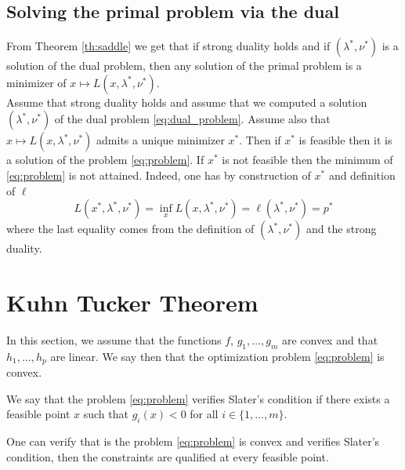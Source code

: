 \documentclass[11pt,nocut]{article}
\begin{document}
\subsection{Solving the primal problem via the dual}

From Theorem \ref{th:saddle} we get that if strong duality holds and if $(\lambda^*,\nu^*)$ is a solution of the dual problem, then any solution of the primal problem is a minimizer of $x \mapsto L(x,\lambda^*,\nu^*)$.
\\

Assume that strong duality holds and assume that we computed a solution $(\lambda^*,\nu^*)$ of the dual problem \eqref{eq:dual_problem}. Assume also that $x \mapsto L(x,\lambda^*,\nu^*)$ admits a unique minimizer $x^*$. Then if $x^*$ is feasible then it is a solution of the problem \eqref{eq:problem}. If $x^*$ is not feasible then the minimum of \eqref{eq:problem} is not attained. Indeed, one has by construction of $x^*$ and definition of $\ell$
$$
L(x^*,\lambda^*,\nu^*) = \inf_{x} L(x,\lambda^*,\nu^*) = \ell(\lambda^*,\nu^*) = p^*
$$
where the last equality comes from the definition of $(\lambda^*,\nu^*)$ and the strong duality.


\section{Kuhn Tucker Theorem}

In this section, we assume that the functions $f$, $g_1, \dots, g_m$ are convex and that $h_1, \dots, h_p$ are linear. We say then that the optimization problem \eqref{eq:problem} is convex.


\begin{definition}
	We say that the problem \eqref{eq:problem} verifies Slater's condition if there exists a feasible point $x$ such that $g_i(x) < 0$ for all $i \in \{1, \dots, m\}$.
\end{definition}
One can verify that is the problem \eqref{eq:problem} is convex and verifies Slater's condition, then the constraints are qualified at every feasible point.
\end{document}
